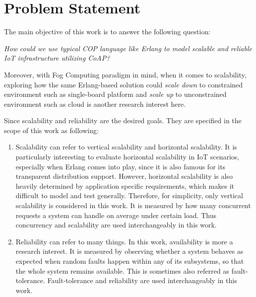 \chapter{Problem Statement}\label{ch2}


The main objective of this work is to answer the following question:

\textit{How could we use typical COP language like Erlang to model scalable and reliable IoT infrastructure utilizing CoAP?}

Moreover, with Fog Computing paradigm in mind, when it comes to scalability, exploring how the same Erlang-based solution could \textit{scale down} to constrained environment such as single-board platform and \textit{scale up} to unconstrained environment such as cloud is another research interest here.

Since scalability and reliability are the desired goals. They are specified in the scope of this work as following:

\begin{enumerate}

\item Scalability can refer to vertical scalability and horizontal scalability. It is particularly interesting to evaluate horizontal scalability in IoT scenarios, especially when Erlang comes into play, since it is also famous for its transparent distribution support. However, horizontal scalability is also heavily determined by application specific requirements, which makes it difficult to model and test generally. Therefore, for simplicity, only vertical scalability is considered in this work. It is measured by how many concurrent requests a system can handle on average under certain load. Thus concurrency and scalability are used interchangeably in this work.

\item Reliability can refer to many things. In this work, availability is more a research interest. It is measured by observing whether a system behaves as expected when random faults happen within any of its subsystems, so that the whole system remains available. This is sometimes also referred as fault-tolerance. Fault-tolerance and reliability are used interchangeably in this work.

\end{enumerate}

